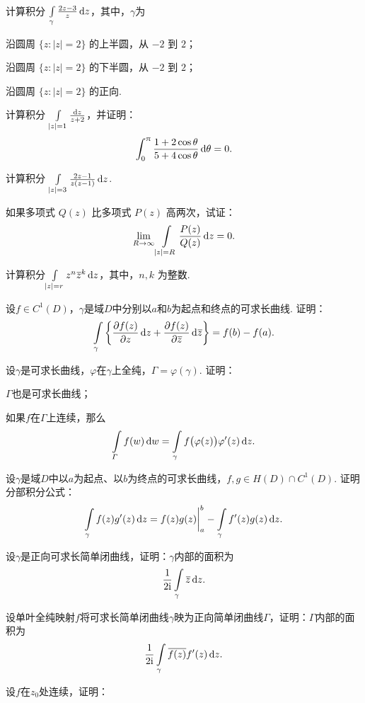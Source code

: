 \begin{xiti}
  \item 计算积分 $\int\limits_\gamma\frac{2z-3}z\mathop{}\!\mathrm dz$，其中，$\gamma$为
    \begin{enuma}
      \item 沿圆周 $\{z:|z|=2\}$ 的上半圆，从 $-2$ 到 $2$；
      \item 沿圆周 $\{z:|z|=2\}$ 的下半圆，从 $-2$ 到 $2$；
      \item 沿圆周 $\{z:|z|=2\}$ 的正向.
    \end{enuma}
  \item 计算积分 $\int\limits_{|z|=1}\frac{\mathop{}\!\mathrm dz}{z+2}$，并证明：
    \[
      \int_0^\uppi\frac{1+2\cos\theta}{5+4\cos\theta} \mathop{}\!\mathrm{d}\theta = 0.
    \]
  \item 计算积分 $\int\limits_{|z|=3}\frac{2z-1}{z(z-1)}\mathop{}\!\mathrm dz$.
  \item 如果多项式 $Q(z)$ 比多项式 $P(z)$ 高两次，试证：
    \[
      \lim_{R\to\infty}\int\limits_{|z|=R}\frac{P(z)}{Q(z)}\mathop{}\!\mathrm dz = 0.
    \]
  \item 计算积分$\int\limits_{|z|=r}z^n{}\mkern1mu\overline{\mkern-1muz}^k\mathop{}\!\mathrm dz$，其中，$n,k$ 为整数.
  \item 设$f\in C^1(D)$，$\gamma$是域$D$中分别以$a$和$b$为起点和终点的可求长曲线. 证明：
    \[
    \int\limits_\gamma \bigg\{\frac{\partial f(z)}{\partial z}\mathop{}\!\mathrm dz + \frac{\partial f(z)}{\partial {}\mkern1mu\overline{\mkern-1muz}}\mathop{}\!\mathrm{d} {}\mkern1mu\overline{\mkern-1muz}\bigg\} = f(b) - f(a).
    \]
  \item 设$\gamma$是可求长曲线，$\varphi$在$\gamma$上全纯，$\Gamma=\varphi(\gamma)$. 证明：
    \begin{enuma}
      \item $\Gamma$也是可求长曲线；
      \item 如果$f$在$\Gamma$上连续，那么
        \[
          \int\limits_\varGamma f(w)\mathop{}\!\mathrm{d} w = \int\limits_\gamma f\big(\varphi(z)\big)\varphi'(z)\mathop{}\!\mathrm dz.
        \]
    \end{enuma}
  \item 设$\gamma$是域$D$中以$a$为起点、以$b$为终点的可求长曲线，$f,g\in H(D)\cap C^1(D)$. 证明分部积分公式：
    \[
      \int\limits_\gamma f(z)g'(z)\mathop{}\!\mathrm dz = f(z)g(z)\bigg|_a^b - \int\limits_\gamma f'(z)g(z)\mathop{}\!\mathrm dz.
    \]
  \item 设$\gamma$是正向可求长简单闭曲线，证明：$\gamma$内部的面积为
    \[
      \frac1{2\mathrm i}\int\limits_\gamma{}\mkern1mu\overline{\mkern-1muz}\mathop{}\!\mathrm dz.
    \]
  \item 设单叶全纯映射$f$将可求长简单闭曲线$\gamma$映为正向简单闭曲线$\Gamma$，证明：$\Gamma$内部的面积为
    \[
      \frac1{2\mathrm i}\int\limits_\gamma {}\mkern1mu\overline{\mkern-1muf(z)}f'(z) \mathop{}\!\mathrm dz.
    \]
  \item 设$f$在$z_0$处连续，证明：

\end{xiti}
